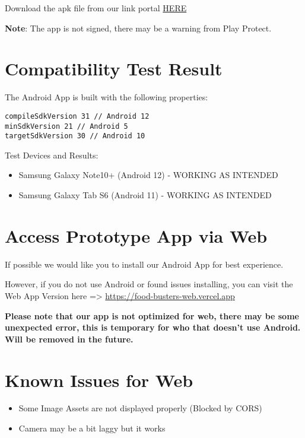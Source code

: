 \documentclass[a4paper,12pt]{article}
\begin{document}
\noindent
\begin{simplechar}
    Download the apk file from our link portal \href{https://food-busters.github.io/prototype}{HERE}
\end{simplechar}

\noindent
\textbf{Note}: The app is not signed, there may be a warning from Play Protect.

\section*{Compatibility Test Result}

\noindent
The Android App is built with the following properties:
\begin{lstlisting}
compileSdkVersion 31 // Android 12
minSdkVersion 21 // Android 5
targetSdkVersion 30 // Android 10
\end{lstlisting}

\noindent
Test Devices and Results:
\begin{itemize}
    \item Samsung Galaxy Note10+ (Android 12) - WORKING AS INTENDED
    \item Samsung Galaxy Tab S6 (Android 11) - WORKING AS INTENDED
\end{itemize}

\section*{Access Prototype App via Web}

If possible we would like you to install our Android App for best experience.

However, if you do not use Android or found issues installing,
you can visit the Web App Version here => \href{https://food-busters-web.vercel.app}{
    https://food-busters-web.vercel.app}

\textbf{
Please note that our app is not optimized for web, there may be some unexpected error, 
this is temporary for who that doesn't use Android. Will be removed in the future.}

\section*{Known Issues for Web}
\begin{itemize}
    \item Some Image Assets are not displayed properly (Blocked by CORS)
    \item Camera may be a bit laggy but it works
\end{itemize}
\end{document}
